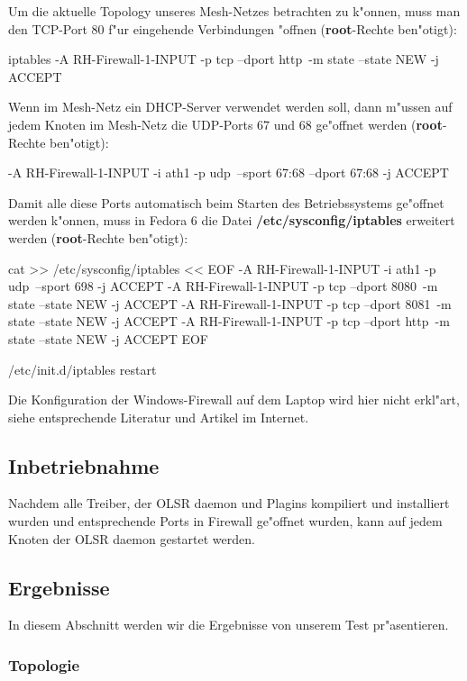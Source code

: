 Um die aktuelle Topology unseres Mesh-Netzes betrachten zu k"onnen,
muss man den TCP-Port 80 f"ur eingehende Verbindungen "offnen
(\textbf{root}-Rechte ben"otigt):
\begin{shelllst}
iptables -A RH-Firewall-1-INPUT -p tcp --dport http\
	-m state --state NEW -j ACCEPT
\end{shelllst}

Wenn im Mesh-Netz ein DHCP-Server verwendet werden soll, dann
m"ussen auf jedem Knoten im Mesh-Netz die UDP-Ports 67 und 68
ge"offnet werden (\textbf{root}-Rechte ben"otigt):
\begin{shelllst}
-A RH-Firewall-1-INPUT -i ath1 -p udp\
	--sport 67:68 --dport 67:68 -j ACCEPT
\end{shelllst}

Damit alle diese Ports automatisch beim Starten des Betriebssystems
ge"offnet werden k"onnen, muss in Fedora 6
die Datei \textbf{/etc/sysconfig/iptables} erweitert werden
(\textbf{root}-Rechte ben"otigt):
\begin{shelllst}
cat >> /etc/sysconfig/iptables << EOF
-A RH-Firewall-1-INPUT -i ath1 -p udp\
	--sport 698 -j ACCEPT
-A RH-Firewall-1-INPUT -p tcp --dport 8080\
	-m state --state NEW -j ACCEPT
-A RH-Firewall-1-INPUT -p tcp --dport 8081\
	-m state --state NEW -j ACCEPT
-A RH-Firewall-1-INPUT -p tcp --dport http\
	-m state --state NEW -j ACCEPT
EOF

/etc/init.d/iptables restart
\end{shelllst}

Die Konfiguration der Windows-Firewall auf dem Laptop wird hier nicht erkl"art,
siehe entsprechende Literatur und Artikel im Internet.

\subsection{Inbetriebnahme}

Nachdem alle Treiber, der OLSR daemon und Plagins kompiliert und installiert
wurden und entsprechende Ports in Firewall ge"offnet wurden,
kann auf jedem Knoten der OLSR daemon gestartet werden.

\subsection{Ergebnisse}

In diesem Abschnitt werden wir die Ergebnisse von unserem Test pr"asentieren.

\subsubsection{Topologie}

